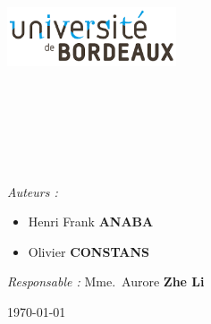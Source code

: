 
\begin{titlepage}

\begin{center}

\begin{minipage}[t]{0.48\textwidth}
  \begin{flushleft}
    \includegraphics [width=50mm]{./images/index.png} \\[0.5cm]
  \end{flushleft}
\end{minipage}
\begin{minipage}[t]{0.48\textwidth}
  \begin{flushright}
  \end{flushright}
\end{minipage} \\[1.5cm]

\textsc{\Large \reportsubject}\\[0.5cm]
\HRule \\[0.4cm]
{\huge \bfseries \reporttitle}\\[0.4cm]
\HRule \\[1.5cm]

\begin{minipage}[t]{0.6\textwidth}
  \begin{flushleft} \large
    \emph{Auteurs :}
    \begin{itemize}
\item Henri Frank \textbf{ANABA}\\ 
\item Olivier \textbf{CONSTANS}\\
\end{itemize}
   
  \end{flushleft}
\end{minipage}

\hfill

\vfill

\vfill

\vfill

\vfill

\begin{minipage}[t]{0.99\textwidth}
  \begin{flushleft} \large
    \emph{Responsable :} 
    Mme.~Aurore \textbf{Zhe Li}
  \end{flushleft}
\end{minipage}

\vfill


{\today}

\end{center}

\end{titlepage}
